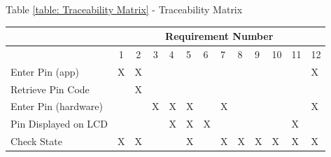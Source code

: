 Table \ref{table: Traceability Matrix} - Traceability Matrix 
\begin{table}[htb]
\begin{tabular}{lccclllllllll}
                                           & \multicolumn{12}{c}{Requirement Number}                                                                                                                                                                                                                                                                      \\ \hline
\multicolumn{1}{|c|}{}                     & \multicolumn{1}{c|}{1} & \multicolumn{1}{c|}{2} & \multicolumn{1}{c|}{3} & \multicolumn{1}{l|}{4} & \multicolumn{1}{l|}{5} & \multicolumn{1}{l|}{6} & \multicolumn{1}{l|}{7} & \multicolumn{1}{l|}{8} & \multicolumn{1}{l|}{9} & \multicolumn{1}{l|}{10} & \multicolumn{1}{l|}{11} & \multicolumn{1}{l|}{12} \\ \hline
\multicolumn{1}{|l|}{Enter Pin (app)}      & \multicolumn{1}{c|}{X} & \multicolumn{1}{c|}{X} & \multicolumn{1}{c|}{}  & \multicolumn{1}{l|}{}  & \multicolumn{1}{l|}{}  & \multicolumn{1}{l|}{}  & \multicolumn{1}{l|}{}  & \multicolumn{1}{l|}{}  & \multicolumn{1}{l|}{}  & \multicolumn{1}{l|}{}   & \multicolumn{1}{l|}{}   & \multicolumn{1}{l|}{X}  \\ \hline
\multicolumn{1}{|l|}{Retrieve Pin Code}    & \multicolumn{1}{c|}{}  & \multicolumn{1}{c|}{X} & \multicolumn{1}{c|}{}  & \multicolumn{1}{l|}{}  & \multicolumn{1}{l|}{}  & \multicolumn{1}{l|}{}  & \multicolumn{1}{l|}{}  & \multicolumn{1}{l|}{}  & \multicolumn{1}{l|}{}  & \multicolumn{1}{l|}{}   & \multicolumn{1}{l|}{}   & \multicolumn{1}{l|}{}   \\ \hline
\multicolumn{1}{|l|}{Enter Pin (hardware)} & \multicolumn{1}{c|}{}  & \multicolumn{1}{c|}{}  & \multicolumn{1}{c|}{X} & \multicolumn{1}{l|}{X} & \multicolumn{1}{l|}{X} & \multicolumn{1}{l|}{}  & \multicolumn{1}{l|}{X} & \multicolumn{1}{l|}{}  & \multicolumn{1}{l|}{}  & \multicolumn{1}{l|}{}   & \multicolumn{1}{l|}{}   & \multicolumn{1}{l|}{X}  \\ \hline
\multicolumn{1}{|l|}{Pin Displayed on LCD} & \multicolumn{1}{l|}{}  & \multicolumn{1}{l|}{}  & \multicolumn{1}{l|}{}  & \multicolumn{1}{l|}{X} & \multicolumn{1}{l|}{X} & \multicolumn{1}{l|}{X} & \multicolumn{1}{l|}{}  & \multicolumn{1}{l|}{}  & \multicolumn{1}{l|}{}  & \multicolumn{1}{l|}{}   & \multicolumn{1}{l|}{X}  & \multicolumn{1}{l|}{}   \\ \hline
\multicolumn{1}{|l|}{Check State}          & \multicolumn{1}{l|}{X} & \multicolumn{1}{l|}{X} & \multicolumn{1}{l|}{}  & \multicolumn{1}{l|}{}  & \multicolumn{1}{l|}{X} & \multicolumn{1}{l|}{}  & \multicolumn{1}{l|}{X} & \multicolumn{1}{l|}{X} & \multicolumn{1}{l|}{X} & \multicolumn{1}{l|}{X}  & \multicolumn{1}{l|}{X}  & \multicolumn{1}{l|}{X}  \\ \hline

\end{tabular}
\end{table}
